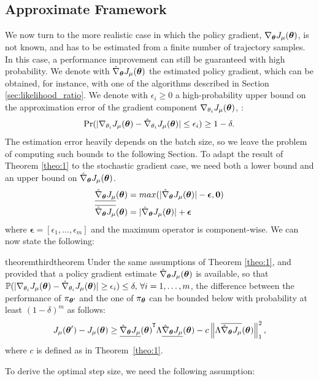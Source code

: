 \subsection{Approximate Framework}\label{sec:approx}
We now turn to the more realistic case in which the policy gradient, $\gradJ{\vtheta}$, is not known, and has to be estimated from a finite number of trajectory samples. In this case, a performance improvement can still be guaranteed with high probability. 
We denote with $\gradApp{\vtheta}$ the estimated policy gradient, which can be obtained, for instance, with one of the algorithms described in Section \ref{sec:likelihood_ratio}.
We denote with $\epsilon_i \geq 0$ a high-probability upper bound on the approximation error of the gradient component $\gradJ{\theta_i}$, \ie:
\[
	\Pr(|\gradJ{\theta_i} - \gradApp{\theta_i}| \leq \epsilon_i) \geq 1-\delta.
\]
The estimation error heavily depends on the batch size, so we leave the problem of computing such bounds to the following Section.
To adapt the result of Theorem \ref{theo:1} to the stochastic gradient case, we need both a lower bound and an upper bound on $\gradApp{\vtheta}$.
\begin{align*}
\gradDown{\vtheta} &= max(|\gradApp{\vtheta}| - \boldsymbol{\epsilon},\boldsymbol{0}) \\
\gradUp{\vtheta} &= |\gradApp{\vtheta}| + \boldsymbol{\epsilon}
\end{align*}
where $\boldsymbol{\epsilon}=[\epsilon_1,\dotsc,\epsilon_m]$ and the maximum operator is component-wise.
We can now state the following: 

\begin{restatable}{theorem}{thirdtheorem}\label{theo:3}
Under the same assumptions of Theorem \ref{theo:1}, and provided that a policy gradient estimate $\gradApp{\vtheta}$ is available, so that $\mathbb{P}(|\gradJ{\theta_i}-\gradApp{\theta_i}| \geq \epsilon_i) \leq \delta, \, \forall i=1,\dotsc,m$, the difference between the performance of $\pi_{\vtheta'}$ and the one of $\pi_ {\vtheta}$ can be bounded below with probability at least $(1-\delta)^m$ as follows:
\[
\DeltaJ \geq \transpose{\gradDown{\vtheta}}\Lambda\gradDown{\vtheta} - 				 c\norm[1]{\Lambda\gradUp{\vtheta}}^2,
\]
where $c$ is defined as in Theorem~\ref{theo:1}.
\end{restatable}

To derive the optimal step size, we need the following assumption:

